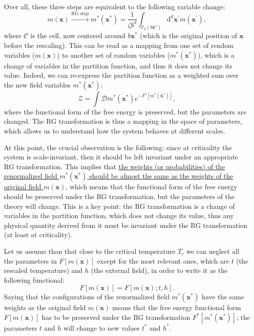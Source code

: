 Over all, these three steps are equivalent to the following variable change:
\[
    m(\mathbf{x}) \xrightarrow{\text{RG step}} m^{*}(\mathbf{x}^*) = \frac{1}{\zeta b^d}\int_{\mathcal{C}_b(b \mathbf{x}^*)} \mathrm{d}^d \mathbf{x}^{\prime} m(\mathbf{x}^{\prime}),
\]
where \(\mathcal{C}\) is the cell, now centered around \(b \mathbf{x}^*\) (which is the original position of \(\mathbf{x}\) before the rescaling). This can be read as a mapping from one set of rendom variables (\(m(\mathbf{x})\)) to another set of random variables (\(m^{*}(\mathbf{x}^*)\)), which is a change of variables in the partition function, and thus it does not change its value. Indeed, we can re-express the partition function as a weighted sum over the new field variables \(m^{*}(\mathbf{x}^*)\):
\[
    \mathcal{Z} = \int \mathcal{D} m^{*}(\mathbf{x}^*) e^{-F^*[m^{*}(\mathbf{x}^*)]},
\]
where the functional form of the free energy is preserved, but the parameters are changed. The RG transformation is thus a mapping in the space of parameters, which allows us to understand how the system behaves at different scales.

At this point, the crucial observation is the following: since at criticality the system is scale-invariant, then it should be left invariant under an appropriate RG transformation. This implies that \uline{the weights (or probabilities) of the renormalized field \(m^*(\mathbf{x}^*)\) should be almost the same as the weights of the original field \(m(\mathbf{x})\)}, which means that the functional form of the free energy should be preserved under the RG transformation, but the parameters of the theory will change. This is a key point: the RG transformation is a change of variables in the partition function, which does not change its value, thus any physical quantity derived from it must be invariant under the RG transformation (at least at criticality).

Let us assume than that close to the critical temperature \(T_c\) we can neglect all the parameters in \(F[m(\mathbf{x})]\) except for the most relevant ones, which are \(t\) (the rescaled temperature) and \(h\) (the external field), in order to write it as the following functional:
\[
    F[m(\mathbf{x})] = F[m(\mathbf{x}); t, h].
\]
Saying that the configurations of the renormalized field \(m^*(\mathbf{x}^*)\) have the same weights as the original field \(m(\mathbf{x})\) means that the free energy functional form \(F[m(\mathbf{x})]\) has to be preserved under the RG transformation \(F^*[m^*(\mathbf{x}^*)]\); the parameters \(t\) and \(h\) will change to new values \(t^*\) and \(h^*\).

